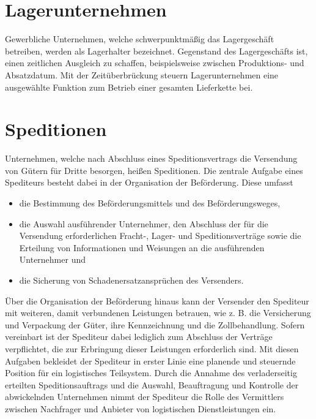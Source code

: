 \documentclass[a4paper,12pt]{scrreprt}
\begin{document}
	\section{Lagerunternehmen}
	Gewerbliche Unternehmen, welche schwerpunktmäßig das Lagergeschäft betreiben, werden als Lagerhalter bezeichnet. Gegenstand des Lagergeschäfts ist, einen zeitlichen Ausgleich zu schaffen, beispielsweise zwischen Produktions- und Absatzdatum. Mit der Zeitüberbrückung steuern Lagerunternehmen eine ausgewählte Funktion zum Betrieb einer gesamten Lieferkette bei. 
	\section{Speditionen}
	Unternehmen, welche nach Abschluss eines Speditionsvertrags die Versendung von Gütern für Dritte besorgen, heißen Speditionen. Die zentrale Aufgabe eines Spediteurs besteht dabei in der Organisation der Beförderung. Diese umfasst
	\begin{itemize}
	\item die Bestimmung des Beförderungsmittels und des Beförderungsweges,
	\item die Auswahl ausführender Unternehmer, den Abschluss der für die Versendung erforderlichen Fracht-, Lager- und Speditionsverträge sowie die Erteilung von Informationen und Weisungen an die ausführenden Unternehmer und
	\item die Sicherung von Schadenersatzansprüchen des Versenders.
	\end{itemize}
	Über die Organisation der Beförderung hinaus kann der Versender den Spediteur mit weiteren, damit verbundenen Leistungen betrauen, wie z. B. die Versicherung und Verpackung der Güter, ihre Kennzeichnung und die Zollbehandlung. Sofern vereinbart ist der Spediteur dabei lediglich zum Abschluss der Verträge verpflichtet, die zur Erbringung dieser Leistungen erforderlich sind. Mit diesen Aufgaben bekleidet der Spediteur in erster Linie eine planende und steuernde Position für ein logistisches Teilsystem. Durch die Annahme des verladerseitig erteilten Speditionsauftrags und die Auswahl, Beauftragung und Kontrolle der abwickelnden Unternehmen nimmt der Spediteur die Rolle des Vermittlers zwischen Nachfrager und Anbieter von logistischen Dienstleistungen ein.
\end{document}
